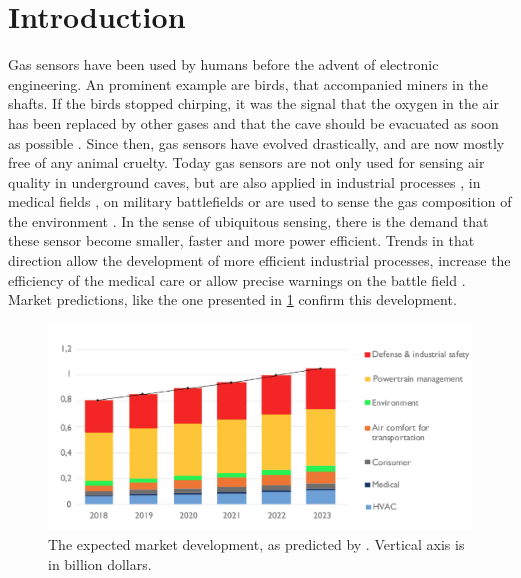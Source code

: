 \section{Introduction}
\label{sec:introduction}

Gas sensors have been used by humans before the advent of electronic engineering. An prominent example are birds, that accompanied miners in the shafts. If the birds stopped chirping, it was the signal that the oxygen in the air has been replaced by other gases and that the cave should be evacuated as soon as possible \cite{nrc1991}. Since then, gas sensors have evolved drastically, and are now mostly free of any animal cruelty. Today gas sensors are not only used for sensing air quality in underground caves, but are also applied in industrial processes \cite{Johny2016, Wang2017}, in medical fields \cite{Eamsaard2016, Wilson2018}, on military battlefields \cite{Kumar2020a} or are used to sense the gas composition of the environment \cite{Harrou2018}. In the sense of ubiquitous sensing, there is the demand that these sensor become smaller, faster and more power efficient. Trends in that direction allow the development of more efficient industrial processes, increase the efficiency of the medical care or allow precise warnings on the battle field \cite{Wang2022, Kumar2020, Mathew2021}. Market predictions, like the one presented in \cref{fig:gas_sensor_market} confirm this development. \\
\begin{figure}
\centering
    \includegraphics[width=\textwidth]{01_Introduction/fig/gas_sensor_market.jpg}
    \caption{The expected market development, as predicted by \cite{yole2021}. Vertical axis is in billion dollars.}
    \label{fig:gas_sensor_market}
\end{figure}
